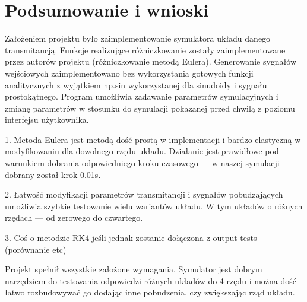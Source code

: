 \documentclass[10pt, a4paper]{article}
\begin{document}

\section{Podsumowanie i wnioski}

Założeniem projektu było zaimplementowanie symulatora układu danego transmitancją. Funkcje realizujące różniczkowanie zostały 
zaimplementowane przez autorów projektu (różniczkowanie metodą Eulera). Generowanie sygnałów wejściowych zaimplementowano bez wykorzystania
gotowych funkcji analitycznych z wyjątkiem np.sin wykorzystanej dla sinudoidy i sygnału prostokątnego. Program umożliwia zadawanie 
parametrów symulacyjnych i zmianę parametrów w stosunku do symulacji pokazanej przed chwilą z poziomu interfejsu użytkownika. 

\vspace{0.5cm}

1. Metoda Eulera jest metodą dość prostą w implementacji i bardzo elastyczną w modyfikowaniu dla dowolnego rzędu układu. 
Działanie jest prawidłowe pod warunkiem dobrania odpowiedniego kroku czasowego --- w naszej symulacji dobrany został krok 0.01s. 

\vspace{0.5cm}

2. Łatwość modyfikacji parametrów transmitancji i sygnałów pobudzających umożliwia szybkie testowanie wielu wariantów układu. W tym układów
o różnych rzędach --- od zerowego do czwartego. 

\vspace{0.5cm}

3. Coś o metodzie RK4 jeśli jednak zostanie dołączona z output tests (porównanie etc)

\vspace{0.5cm}

Projekt spełnił wszystkie założone wymagania. Symulator jest dobrym narzędziem do testowania odpowiedzi różnych układów do 4 rzędu 
i można dość łatwo rozbudowywać go dodając inne pobudzenia, czy zwiększając rząd układu. 
\end{document}
